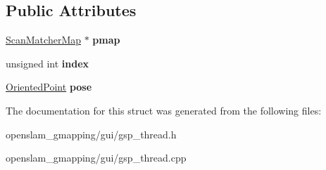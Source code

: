 \subsection*{Public Attributes}
\begin{DoxyCompactItemize}
\item 
\mbox{\label{structGridSlamProcessorThread_1_1MapEvent_af0d5879e3c40d9ad9d357e57c0ac4146}} 
\hyperlink{classGMapping_1_1Map}{Scan\+Matcher\+Map} $\ast$ {\bfseries pmap}
\item 
\mbox{\label{structGridSlamProcessorThread_1_1MapEvent_ade5f6e8f895d74a79f1f1c6d19c254bd}} 
unsigned int {\bfseries index}
\item 
\mbox{\label{structGridSlamProcessorThread_1_1MapEvent_ab261b496abc1e69426702fc77692d308}} 
\hyperlink{structGMapping_1_1orientedpoint}{Oriented\+Point} {\bfseries pose}
\end{DoxyCompactItemize}


The documentation for this struct was generated from the following files\+:\begin{DoxyCompactItemize}
\item 
openslam\+\_\+gmapping/gui/gsp\+\_\+thread.\+h\item 
openslam\+\_\+gmapping/gui/gsp\+\_\+thread.\+cpp\end{DoxyCompactItemize}
